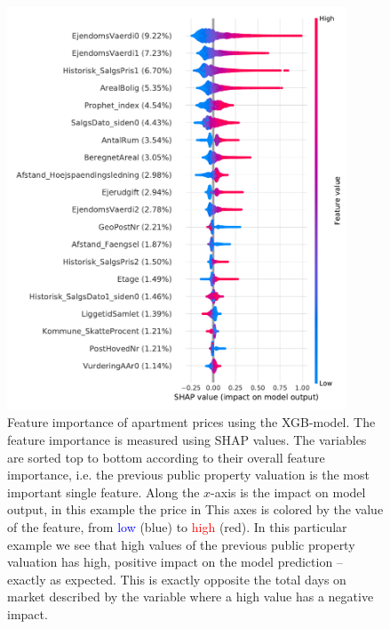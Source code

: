 \begin{figure}[ht!]
  \centerfloat
  \includegraphics[width=0.9\textwidth, trim=0 0 0 1, clip]{figures/housing/Ejerlejlighed_v19_cut_all_Ncols_all_xgb_tight_SHAP_vals_summary.pdf}
  \caption[Feature importance of Apartments Prices]
          {Feature importance of apartment prices using the XGB-model. The feature importance is measured using SHAP values. The variables are sorted top to bottom according to their overall feature importance, i.e. the previous public property valuation  is the most important single feature. Along the $x$-axis is the impact on model output, in this example the price in \si{\Mkr} This axes is colored by the value of the feature, from \textcolor{blue}{low} (blue) to \textcolor{red}{high} (red). In this particular example we see that high values of the previous public property valuation has high, positive impact on the model prediction -- exactly as expected. This is exactly opposite the total days on market described by the variable  where a high value has a negative impact.  
          } 
  \label{fig:h:shap_overview}
\end{figure}

